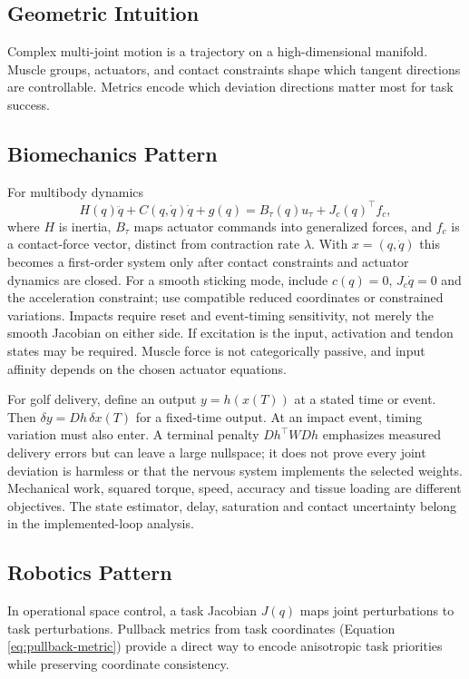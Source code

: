 \documentclass[11pt,letterpaper]{article}
\begin{document}
\subsection{Geometric Intuition}
Complex multi-joint motion is a trajectory on a high-dimensional manifold. Muscle groups, actuators, and contact constraints shape which tangent directions are controllable. Metrics encode which deviation directions matter most for task success.

\subsection{Biomechanics Pattern}
For multibody dynamics
\begin{equation}
H(q)\ddot q + C(q,\dot q)\dot q + g(q) = B_\tau(q)u_\tau + J_c(q)^\top f_c,
\label{eq:multibody}
\end{equation}
where $H$ is inertia, $B_\tau$ maps actuator commands into generalized forces, and $f_c$ is a contact-force vector, distinct from contraction rate $\lambda$. With $x=(q,\dot q)$ this becomes a first-order system only after contact constraints and actuator dynamics are closed. For a smooth sticking mode, include $c(q)=0$, $J_c\dot q=0$ and the acceleration constraint; use compatible reduced coordinates or constrained variations. Impacts require reset and event-timing sensitivity, not merely the smooth Jacobian on either side. If excitation is the input, activation and tendon states may be required. Muscle force is not categorically passive, and input affinity depends on the chosen actuator equations.

For golf delivery, define an output $y=h(x(T))$ at a stated time or event. Then $\delta y=Dh\,\delta x(T)$ for a fixed-time output. At an impact event, timing variation must also enter. A terminal penalty $Dh^\top WDh$ emphasizes measured delivery errors but can leave a large nullspace; it does not prove every joint deviation is harmless or that the nervous system implements the selected weights. Mechanical work, squared torque, speed, accuracy and tissue loading are different objectives. The state estimator, delay, saturation and contact uncertainty belong in the implemented-loop analysis.

\subsection{Robotics Pattern}
In operational space control, a task Jacobian $J(q)$ maps joint perturbations to task perturbations. Pullback metrics from task coordinates (Equation \eqref{eq:pullback-metric}) provide a direct way to encode anisotropic task priorities while preserving coordinate consistency.
\end{document}
